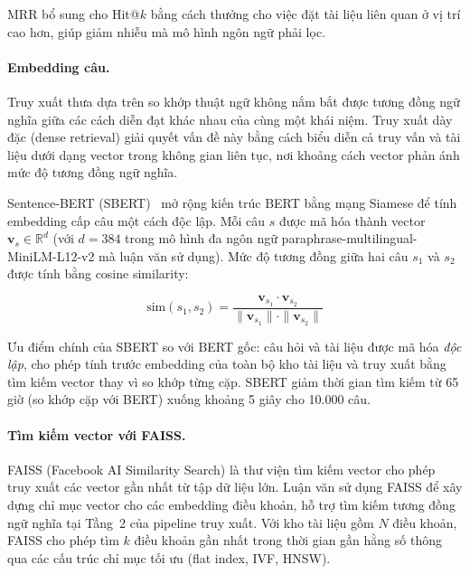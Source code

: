 MRR bổ sung cho Hit@$k$ bằng cách thưởng cho việc đặt tài liệu liên quan ở vị trí
cao hơn, giúp giảm nhiễu mà mô hình ngôn ngữ phải lọc.

\paragraph{Embedding câu.}
\label{subsec:embedding-cau}
Truy xuất thưa dựa trên so khớp thuật ngữ không nắm bắt được tương đồng ngữ nghĩa
giữa các cách diễn đạt khác nhau của cùng một khái niệm. Truy xuất dày đặc (dense
retrieval) giải quyết vấn đề này bằng cách biểu diễn cả truy vấn và tài liệu dưới
dạng vector trong không gian liên tục, nơi khoảng cách vector phản ánh mức độ tương
đồng ngữ nghĩa.

Sentence-BERT (SBERT)~\cite{reimers2019sbert} mở rộng kiến trúc BERT bằng mạng
Siamese để tính embedding cấp câu một cách độc lập. Mỗi câu $s$ được mã hóa thành
vector $\mathbf{v}_s \in \mathbb{R}^d$ (với $d = 384$ trong mô hình đa ngôn ngữ
paraphrase-multilingual-MiniLM-L12-v2 mà luận văn sử dụng). Mức độ tương đồng giữa
hai câu $s_1$ và $s_2$ được tính bằng cosine similarity:

\begin{equation}
  \text{sim}(s_1, s_2) = \frac{\mathbf{v}_{s_1} \cdot \mathbf{v}_{s_2}}
  {\|\mathbf{v}_{s_1}\| \cdot \|\mathbf{v}_{s_2}\|}
  \label{eq:cosine-sim}
\end{equation}

Ưu điểm chính của SBERT so với BERT gốc: câu hỏi và tài liệu được mã hóa
\textit{độc lập}, cho phép tính trước embedding của toàn bộ kho tài liệu và truy
xuất bằng tìm kiếm vector thay vì so khớp từng cặp. SBERT giảm thời gian tìm kiếm
từ 65 giờ (so khớp cặp với BERT) xuống khoảng 5 giây cho 10.000 câu.

\paragraph{Tìm kiếm vector với FAISS.}
\label{subsec:faiss}
FAISS (Facebook AI Similarity Search) là thư viện tìm kiếm vector cho phép truy
xuất các vector gần nhất từ tập dữ liệu lớn. Luận văn sử dụng FAISS để xây dựng
chỉ mục vector cho các embedding điều khoản, hỗ trợ tìm kiếm tương đồng ngữ nghĩa
tại Tầng~2 của pipeline truy xuất. Với kho tài liệu gồm $N$ điều khoản, FAISS cho
phép tìm $k$ điều khoản gần nhất trong thời gian gần hằng số thông qua các cấu trúc
chỉ mục tối ưu (flat index, IVF, HNSW).

